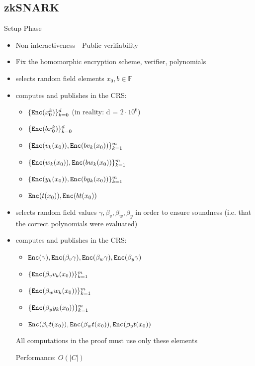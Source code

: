 \documentclass[handout]{beamer}
\begin{document}
\subsection{zkSNARK}
\begin{frame}[allowframebreaks]{Setup Phase} 
    \begin{itemize}
        \item Non interactiveness - Public verifiability 
        \item Fix the homomorphic encryption scheme, verifier, polynomials  
        \item \ver selects random field elements $x_0,b \in \mathbb{F}$  
        \item computes and publishes in the CRS:
        \begin{itemize}
            \item $\{ \mathtt{Enc}(x_0^k) \}_{k=0}^d$  (in reality: d = $2 \cdot 10^6$)
            \item $\{ \mathtt{Enc}(bx_0^k)\}_{k=0}^d$  
            \item $\{ \mathtt{Enc}(v_k(x_0)),\mathtt{Enc}(bv_k(x_0)) \}_{k=1}^m$  
            \item $\{ \mathtt{Enc}(w_k(x_0)),\mathtt{Enc}(bw_k(x_0)) \}_{k=1}^m$  
            \item $\{ \mathtt{Enc}(y_k(x_0)),\mathtt{Enc}(by_k(x_0)) \}_{k=1}^m$  
            \item $\mathtt{Enc}(t(x_0)), \mathtt{Enc}(bt(x_0))$
        \end{itemize} 

        \framebreak

        \item selects random field values $\gamma, \beta_v, \beta_w, \beta_y$ in order to ensure soundness (i.e. that the correct polynomials were evaluated) \pause
        \item computes and publishes in the CRS: \pause
        \begin{itemize}
            \item $\mathtt{Enc}(\gamma), \mathtt{Enc}(\beta_v \gamma), \mathtt{Enc}(\beta_w \gamma), \mathtt{Enc}(\beta_y \gamma)$ \pause
            \item $\{ \mathtt{Enc}( \beta_v v_k(x_0))\}_{k=1}^m$ \pause
            \item $\{ \mathtt{Enc}(\beta_w w_k(x_0))\}_{k=1}^m$ \pause
            \item $\{ \mathtt{Enc}(\beta_y y_k(x_0))\}_{k=1}^m$ \pause
            \item $\mathtt{Enc}(\beta_v t(x_0)), \mathtt{Enc}(\beta_w t(x_0)), \mathtt{Enc}(\beta_y t(x_0))$ \pause
        \end{itemize} 

        All computations in the proof must use only these elements \pause

        Performance: $O(|C|)$
    \end{itemize}
\end{frame}
\end{document}

